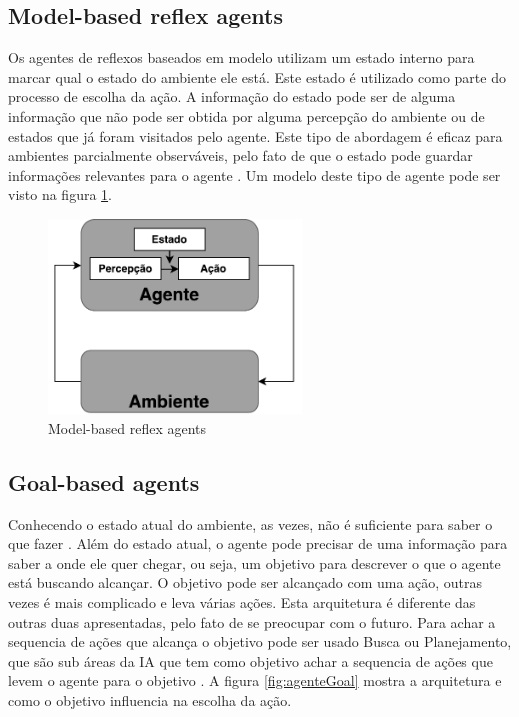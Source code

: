 \subsection{Model-based reflex agents}

Os agentes de reflexos baseados em modelo utilizam um estado interno para marcar qual o estado do ambiente ele está. Este estado é utilizado como parte do processo de escolha da ação. A informação do estado pode ser de alguma informação que não pode ser obtida por alguma percepção do ambiente ou de estados que já foram visitados pelo agente. Este tipo de abordagem é eficaz para ambientes parcialmente observáveis, pelo fato de que o estado pode guardar informações relevantes para o agente \cite{intelligence2003modern}. Um modelo deste tipo de agente pode ser visto na figura \ref{fig:agenteModelbased}. 

\begin{figure}[ht]
	\centering
	\includegraphics[width=0.6\textwidth]{fig/agentModel.pdf}
	\caption{Model-based reflex agents}
	\label{fig:agenteModelbased}
\end{figure} 

\subsection{Goal-based agents}

Conhecendo o estado atual do ambiente, as vezes, não é suficiente para saber o que fazer \cite{intelligence2003modern}. Além do estado atual, o agente pode precisar de uma informação para saber a onde ele quer chegar, ou seja, um objetivo para descrever o que o agente está buscando alcançar. O objetivo pode ser alcançado com uma ação, outras vezes é mais complicado e leva várias ações. Esta arquitetura é diferente das outras duas apresentadas, pelo fato de se preocupar com o futuro. Para achar a sequencia de ações que alcança o objetivo pode ser usado Busca ou Planejamento, que são sub áreas da IA que tem como objetivo achar a sequencia de ações que levem o agente para o objetivo \cite{intelligence2003modern}. A figura \ref{fig:agenteGoal} mostra a arquitetura e como o objetivo influencia na escolha da ação. 

